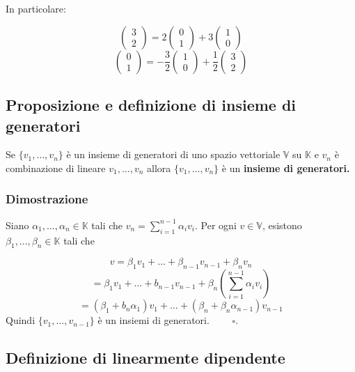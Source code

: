 \documentclass[12pt]{article}
\begin{document}
\\\\
In particolare:

\[\begin{pmatrix}
    3\\
    2
\end{pmatrix} = 2\begin{pmatrix}
    0\\
    1
\end{pmatrix} + 3\begin{pmatrix}
    1\\
    0
\end{pmatrix}\]
\[\begin{pmatrix}
    0\\
    1
\end{pmatrix} = -\frac{3}{2} \begin{pmatrix}
    1\\
    0
\end{pmatrix} + \frac{1}{2}\begin{pmatrix}
    3\\
    2
\end{pmatrix}\]

\subsection{Proposizione e definizione di insieme di generatori}

Se $\{v_1, \dots, v_n\}$ è un insieme di generatori di uno spazio vettoriale $\mathbb{V}$ su $\mathbb{K}$ e $v_n$ è combinazione di lineare $v_1, \dots, v_n$ allora
$\{v_1, \dots, v_n\}$ è un \textbf{insieme di generatori.}

\subsubsection{Dimostrazione}

Siano $\alpha_1, \dots, \alpha_n \in \mathbb{K}$ tali che $v_n = \sum^{n-1}_{i=1} \alpha_iv_i$. Per ogni $v \in \mathbb{V}$, esistono $\beta_1, \dots, \beta_n \in \mathbb{K}$ tali che

\[v = \beta_1v_1 + \dots + \beta_{n-1}v_{n-1} + \beta_nv_n\]
\[= \beta_1v_1 +  \dots + b_{n-1}v_{n-1} + \beta_n\left(\sum^{n-1}_{i=1} \alpha_iv_i\right)\]
\[= (\beta_1 + b_n\alpha_1)v_1 + \dots + (\beta_n + \beta_n\alpha_{n-1})v_{n-1}\]
Quindi $\{v_1, \dots, v_{n-1}\}$ è un insiemi di generatori. $\quad \quad \square$.

\subsection{Definizione di linearmente dipendente}
\end{document}
